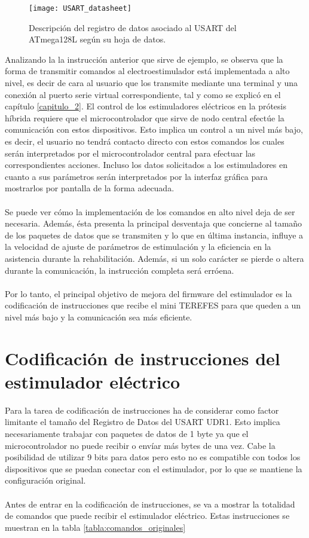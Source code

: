\begin{figure}[!htb]
\centering
\texttt{[image: USART\_datasheet]}
  \caption{Descripción del registro de datos asociado al USART del ATmega128L según su hoja de datos.}\label{fig:USART_datasheet}
\end{figure}

Analizando la la instrucción anterior que sirve de ejemplo, se observa que la forma de transmitir comandos al electroestimulador está implementada a alto nivel, es decir de cara al usuario que los transmite mediante una terminal y una conexión al puerto serie virtual correspondiente, tal y como se explicó en el capítulo \ref{capitulo_2}. El control de los estimuladores eléctricos en la prótesis híbrida requiere que el microcontrolador que sirve de nodo central efectúe la comunicación con estos dispositivos. Esto implica un control a un nivel más bajo, es decir, el usuario no tendrá contacto directo con estos comandos los cuales serán interpretados por el microcontrolador central para efectuar las correspondientes acciones. Incluso los datos solicitados a los estimuladores en cuanto a sus parámetros serán interpretados por la interfaz gráfica para mostrarlos por pantalla de la forma adecuada. 
\\
\\
Se puede ver cómo la implementación de los comandos en alto nivel deja de ser necesaria. Además, ésta presenta la principal desventaja que concierne al tamaño de los paquetes de datos que se transmiten y lo que en última instancia, influye a la velocidad de ajuste de parámetros de estimulación y la eficiencia en la asistencia durante la rehabilitación. Además, si un solo carácter se pierde o altera durante la comunicación, la instrucción completa será erróena.
\\
\\
Por lo tanto, el principal objetivo de mejora del firmware del estimulador es la codificación de instrucciones que recibe el mini TEREFES para que queden a un nivel más bajo y la comunicación sea más eficiente. 


\section{Codificación de instrucciones del estimulador eléctrico}
Para la tarea de codificación de instrucciones ha de considerar como factor limitante el tamaño del Registro de Datos del USART UDR1. Esto implica necesariamente trabajar con paquetes de datos de 1 byte ya que el microcontrolador no puede recibir o envíar más bytes de una vez. Cabe la posibilidad de utilizar 9 bits para datos pero esto no es compatible con todos los dispositivos que se puedan conectar con el estimulador, por lo que se mantiene la configuración original.
\\
\\
Antes de entrar en la codificación de instrucciones, se va a mostrar la totalidad de comandos que puede recibir el estimulador eléctrico. Estas instrucciones se muestran en la tabla \ref{tabla:comandos_originales}


